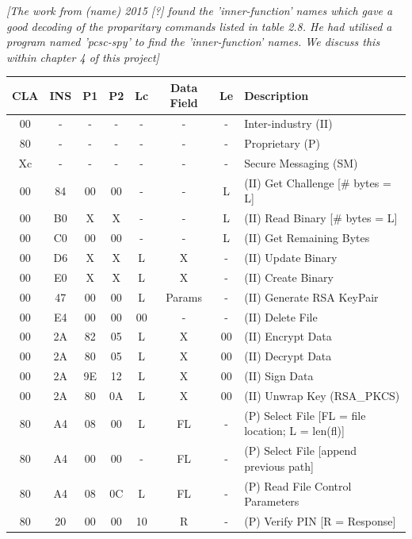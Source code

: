 \documentclass[bsc,frontabs,twoside,singlespacing,parskip,deptreport]{infthesis}     %
\begin{document}
\textit{[The work from (name) 2015 [?] found the 'inner-function' names which gave a good decoding of the proparitary commands listed in table 2.8. He had utilised a program named 'pcsc-spy' to find the 'inner-function' names. We discuss this within chapter 4 of this project]}

\begin{table}[H]
\hskip-1.0cm\begin{tabular}{|c|c|c|c|c|c|c|p{8cm}|}
\hline
CLA & INS & P1 & P2 & Lc  & Data Field & Le & Description\\
\hline
00  & -   & -  & -  & -   & -          & -  & Inter-industry (II)\\
80  & -   & -  & -  & -   & -          & -  & Proprietary (P)\\
Xc  & -   & -  & -  & -   & -          & -  & Secure Messaging (SM)\\
\hline
00  & 84  & 00 & 00 & -   & -          & L  &  (II) Get Challenge [\# bytes = L]\\
00  & B0  & X  & X  & -   & -          & L  &  (II) Read Binary [\# bytes = L] \\
00  & C0  & 00 & 00 & -   & -          & L  &  (II) Get Remaining Bytes\\
00  & D6  & X  & X  & L   & X          & -  &  (II) Update Binary\\
00  & E0  & X  & X  & L   & X          & -  &  (II) Create Binary\\
00  & 47  & 00 & 00 & L   & Params     & -  &  (II) Generate RSA KeyPair\\
00  & E4  & 00 & 00 & 00  & -          & -  &  (II) Delete File\\
00  & 2A  & 82 & 05 & L   & X          & 00 &  (II) Encrypt Data \\
00  & 2A  & 80 & 05 & L   & X          & 00 &  (II) Decrypt Data \\
00  & 2A  & 9E & 12 & L   & X          & 00 &  (II) Sign Data \\
00  & 2A  & 80 & 0A & L   & X          & 00  & (II) Unwrap Key (RSA\_PKCS)\\
\hline
80  & A4  & 08 & 00 & L   & FL         & -  & (P) Select File [FL = file location; L = len(fl)]\\
80  & A4  & 00 & 00 & -   & FL         & -  & (P) Select File [append previous path]\\
80  & A4  & 08 & 0C & L   & FL         & -  & (P) Read File Control Parameters\\
80  & 20  & 00 & 00 & 10  & R          & -  & (P) Verify PIN [R = Response]\\

\end{tabular}
\end{table}
\end{document}
